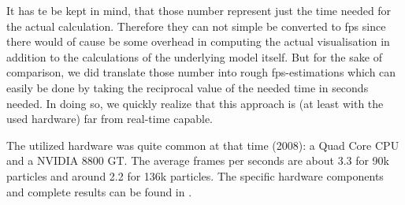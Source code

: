 It has te be kept in mind, that those number represent just the time needed for the actual calculation. Therefore they can not simple be converted to fps since there would of cause be some overhead in computing the actual visualisation in addition to the calculations of the underlying model itself. But for the sake of comparison, we did translate those number into rough fps-estimations which can easily be done by taking the reciprocal value of the needed time in seconds needed. In doing so, we quickly realize that this approach is (at least with the used hardware) far from real-time capable.

The utilized hardware was quite common at that time (2008): a Quad Core CPU and a NVIDIA 8800 GT. The average frames per seconds are about 3.3 for 90k particles and around 2.2 for 136k particles. The specific hardware components and complete results can be found in \cite{krivstof2009hydraulic}.



